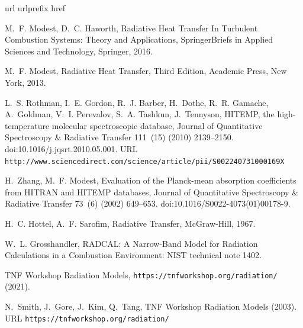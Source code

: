 \documentclass[preprint,12pt]{elsarticle}
\begin{document}

%
%

    \begin{thebibliography}{10}
        \expandafter\ifx\csname url\endcsname\relax
        \def\url#1{\texttt{#1}}\fi
\expandafter\ifx\csname urlprefix\endcsname\relax\def\urlprefix{URL }\fi
\expandafter\ifx\csname href\endcsname\relax
\def\href#1#2{#2} \def\path#1{#1}\fi

M.~F. Modest, D.~C. Haworth, {Radiative Heat Transfer In Turbulent Combustion
Systems: Theory and Applications}, {SpringerBriefs in Applied Sciences and
Technology}, Springer, 2016.

M.~F. Modest, {Radiative Heat Transfer}, Third Edition, {Academic
Press}, New York, 2013.

L.~S. Rothman, I.~E. Gordon, R.~J. Barber, H.~Dothe, R.~R. Gamache, A.~Goldman,
V.~I. Perevalov, S.~A. Tashkun, J.~Tennyson,
\href{http://www.sciencedirect.com/science/article/pii/S002240731000169X}{{{HITEMP},
the high-temperature molecular spectroscopic database}}, {Journal of
Quantitative Spectroscopy {\&} Radiative Transfer} 111~(15) (2010)
2139--2150.
\newblock \href {http://dx.doi.org/10.1016/j.jqsrt.2010.05.001}
  {\path{doi:10.1016/j.jqsrt.2010.05.001}}.
\newline\urlprefix\url{http://www.sciencedirect.com/science/article/pii/S002240731000169X}

H.~Zhang, M.~F. Modest, {Evaluation of the Planck-mean absorption coefficients
from HITRAN and HITEMP databases}, {Journal of Quantitative Spectroscopy {\&}
Radiative Transfer} 73~(6) (2002) 649--653.
\newblock \href {http://dx.doi.org/10.1016/S0022-4073(01)00178-9}
  {\path{doi:10.1016/S0022-4073(01)00178-9}}.

H.~C. Hottel, A.~F. Sarofim, {Radiative Transfer}, McGraw-Hill, 1967.

W.~L. Grosshandler, {{RADCAL}: A Narrow-Band Model for Radiation Calculations
in a Combustion Environment: NIST technical note 1402}.

{TNF Workshop Radiation Models}, \url{https://tnfworkshop.org/radiation/}
(2021).

N.~Smith, J.~Gore, J.~Kim, Q.~Tang,
\href{https://tnfworkshop.org/radiation/}{{{TNF} Workshop Radiation Models}}
(2003).
\newline\urlprefix\url{https://tnfworkshop.org/radiation/}


\end{thebibliography}
\end{document}
